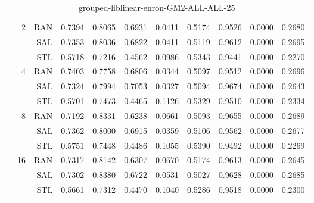 \begin{center}
\begin{table}[htbp]
\begin{center}
\begin{tabular}{ | r | r | r | r | r | r | r | r | r | r | r |}
 & \multirow{3}{*}{2} & RAN & 0.7394 & 0.8065 & 0.6931 & 0.0411 & 0.5174 & 0.9526 & 0.0000 & 0.2680\\ \cline{3-11}
 &   & SAL & 0.7353 & 0.8036 & 0.6822 & 0.0411 & 0.5119 & 0.9612 & 0.0000 & 0.2695\\ \cline{3-11}
 &   & STL & 0.5718 & 0.7216 & 0.4562 & 0.0986 & 0.5343 & 0.9441 & 0.0000 & 0.2270\\ \cline{2-11}
 & \multirow{3}{*}{4} & RAN & 0.7403 & 0.7758 & 0.6806 & 0.0344 & 0.5097 & 0.9512 & 0.0000 & 0.2696\\ \cline{3-11}
 &   & SAL & 0.7324 & 0.7994 & 0.7053 & 0.0327 & 0.5094 & 0.9674 & 0.0000 & 0.2643\\ \cline{3-11}
 &   & STL & 0.5701 & 0.7473 & 0.4465 & 0.1126 & 0.5329 & 0.9510 & 0.0000 & 0.2334\\ \cline{2-11}
 & \multirow{3}{*}{8} & RAN & 0.7192 & 0.8331 & 0.6238 & 0.0661 & 0.5093 & 0.9655 & 0.0000 & 0.2689\\ \cline{3-11}
 &   & SAL & 0.7362 & 0.8000 & 0.6915 & 0.0359 & 0.5106 & 0.9562 & 0.0000 & 0.2677\\ \cline{3-11}
 &   & STL & 0.5751 & 0.7448 & 0.4486 & 0.1055 & 0.5390 & 0.9492 & 0.0000 & 0.2269\\ \cline{2-11}
 & \multirow{3}{*}{16} & RAN & 0.7317 & 0.8142 & 0.6307 & 0.0670 & 0.5174 & 0.9613 & 0.0000 & 0.2645\\ \cline{3-11}
 &   & SAL & 0.7302 & 0.8380 & 0.6722 & 0.0531 & 0.5027 & 0.9628 & 0.0000 & 0.2685\\ \cline{3-11}
 &   & STL & 0.5661 & 0.7312 & 0.4470 & 0.1040 & 0.5286 & 0.9518 & 0.0000 & 0.2300\\ \cline{2-11}
\hline
\end{tabular}
\caption{grouped-liblinear-enron-GM2-ALL-ALL-25}
\end{center}
 \end{table}
\end{center}

